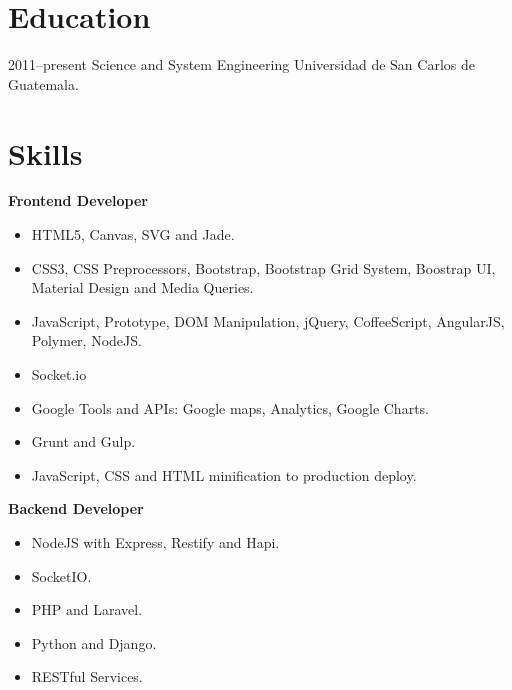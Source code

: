 \documentclass[]{friggeri-cv} %
\begin{document}
\section{Education}

\begin{entrylist}
\entry
{2011--present}
{Science and System Engineering}
{Universidad de San Carlos de Guatemala.}
{}
\end{entrylist}


\section{Skills}

\textbf{Frontend Developer}

\begin{itemize}
	\item HTML5, Canvas, SVG and Jade.
	\item CSS3, CSS Preprocessors, Bootstrap, Bootstrap Grid System, Boostrap UI, Material Design and Media Queries.
	\item JavaScript, Prototype, DOM Manipulation, jQuery, CoffeeScript, AngularJS, Polymer, NodeJS.
	\item Socket.io
	\item Google Tools and APIs: Google maps, Analytics, Google Charts.
	\item Grunt and Gulp.
	\item JavaScript, CSS and HTML minification to production deploy.
\end{itemize}

\textbf{Backend Developer}
\begin{itemize}
	\item NodeJS with Express, Restify and Hapi.
	\item SocketIO.
	\item PHP and Laravel.
	\item Python and Django.
	\item RESTful Services.
\end{itemize}
\end{document}
